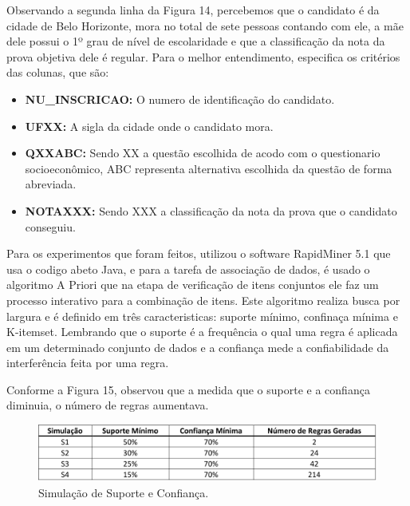\par
Observando a segunda linha da Figura 14, percebemos que o candidato é da cidade de Belo Horizonte, mora no total de sete pessoas contando com ele, a mãe dele possui o 1º grau de nível de escolaridade e que a classificação da nota da prova objetiva dele é regular. Para o melhor entendimento,  especifica os critérios das colunas, que são:

\begin{itemize}
    \item \textbf{NU\_INSCRICAO:} O numero de identificação do candidato. 
    \item \textbf{UFXX:} A sigla da cidade onde o candidato mora.
    \item \textbf{QXXABC:} Sendo XX a questão escolhida de acodo com o questionario socioeconômico, ABC representa alternativa escolhida da questão de forma abreviada.
    \item \textbf{NOTAXXX:} Sendo XXX a classificação da nota da prova que o candidato conseguiu. 
\end{itemize}

\par
Para os experimentos que foram feitos,  utilizou o software RapidMiner 5.1 que usa o codigo abeto Java, e para a tarefa de associação de dados, é usado o algoritmo A Priori que na etapa de verificação de itens conjuntos ele faz um processo interativo para a combinação de itens. Este algoritmo realiza busca por largura e é definido em três caracteristicas: suporte mínimo, confinaça mínima e K-itemset. Lembrando que o suporte é a frequência o qual uma regra é aplicada em um determinado conjunto de dados e a confiança mede a confiabilidade da interferência feita por uma regra. 

\par
Conforme a Figura 15,  observou que a medida que o suporte e a confiança diminuia, o número de regras aumentava.   

\begin{figure}[!htp]
	\begin{center}
    \caption{\label{fig:waveform_fig} Simulação de Suporte e Confiança.}
	\includegraphics[scale=0.49]{Figuras/Simulacao_suporte_confianca.png}
	\end{center}
\end{figure}

